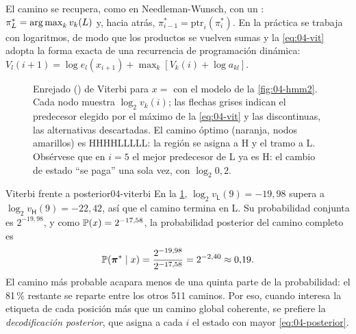\noindent El camino se recupera, como en Needleman-Wunsch, con un : $\pi^*_L=\operatorname*{arg\,max}_k v_k(L)$ y, hacia atrás, $\pi^*_{i-1}=\mathrm{ptr}_i(\pi^*_i)$. En la práctica se trabaja con logaritmos, de modo que los productos se vuelven sumas y la \cref{eq:04-vit} adopta la forma exacta de una recurrencia de programación dinámica: $V_l(i+1)=\log e_l(x_{i+1})+\max_k[V_k(i)+\log a_{kl}]$.

\begin{figure}[tbp]
\centering

\caption[Trellis de Viterbi]{Enrejado () de Viterbi para $x={}$ con el modelo de la \cref{fig:04-hmm2}. Cada nodo muestra $\log_2 v_k(i)$; las flechas grises indican el predecesor elegido por el máximo de la \cref{eq:04-vit} y las discontinuas, las alternativas descartadas. El camino óptimo (naranja, nodos amarillos) es \textsf{HHHHLLLLL}: la región  se asigna a \textsf{H} y el tramo  a \textsf{L}. Obsérvese que en $i=5$ el mejor predecesor de \textsf{L} ya es \textsf{H}: el cambio de estado ``se paga'' una sola vez, con $\log_2 0{,}2$.}
\label{fig:04-trellis}
\end{figure}

\begin{ejemplo}{Viterbi frente a posterior}{04-viterbi}
En la \cref{fig:04-trellis}, $\log_2 v_{\textsf{L}}(9)=-19{,}98$ supera a $\log_2 v_{\textsf{H}}(9)=-22{,}42$, así que el camino termina en \textsf{L}. Su probabilidad conjunta es $2^{-19{,}98}$, y como $\mathbb{P}(x)=2^{-17{,}58}$, la probabilidad posterior del camino completo es
\[
\mathbb{P}(\boldsymbol{\pi}^*\mid x)=\frac{2^{-19{,}98}}{2^{-17{,}58}}=2^{-2{,}40}\approx0{,}19.
\]
El camino más probable acapara menos de una quinta parte de la probabilidad: el 81\,\% restante se reparte entre los otros 511 caminos. Por eso, cuando interesa la etiqueta de cada posición más que un camino global coherente, se prefiere la \emph{decodificación posterior}, que asigna a cada $i$ el estado con mayor \cref{eq:04-posterior}.
\end{ejemplo}

